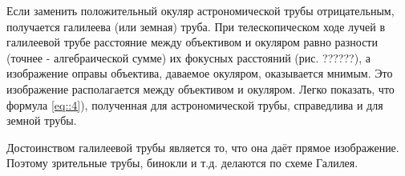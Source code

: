 Если заменить положительный окуляр астрономической трубы отрицательным, получается галилеева 
(или земная) труба. При телескопическом ходе лучей в галилеевой трубе расстояние между объективом 
и окуляром равно разности (точнее - алгебраической сумме) их фокусных расстояний (рис. ??????), а
изображение оправы объектива, даваемое окуляром, оказывается мнимым. Это изображение располагается 
между объективом и окуляром. Легко показать, что формула \eqref{eq::4}), полученная для 
астрономической трубы, справедлива и для земной трубы.

Достоинством галилеевой трубы является то, что она даёт прямое
изображение. Поэтому зрительные трубы, бинокли и т.д. делаются по
схеме Галилея.